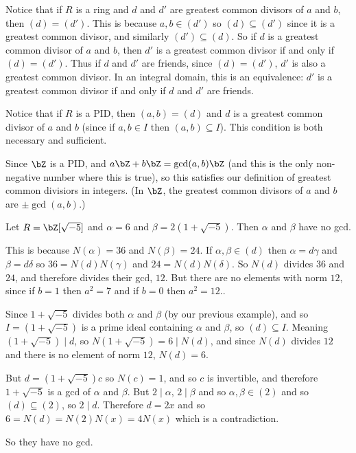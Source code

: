 \documentclass[10pt]{article}
\def\divides{{\mid}}
\begin{document}
Notice that if $R$ is a ring and $d$ and $d'$ are greatest common divisors of $a$ and $b$, then $(d)=(d')$.
This is because $a,b\in(d')$ so $(d)\subseteq(d')$ since it is a greatest common divisor, and similarly $(d')\subseteq(d)$.
So if $d$ is a greatest common divisor of $a$ and $b$, then $d'$ is a greatest common divisor if and only if $(d)=(d')$.
Thus if $d$ and $d'$ are friends, since $(d)=(d')$, $d'$ is also a greatest common divisor.
In an integral domain, this is an equivalence: $d'$ is a greatest common divisor if and only if $d$ and $d'$ are friends.

Notice that if $R$ is a PID, then $(a,b)=(d)$ and $d$ is a greatest common divisor of $a$ and $b$ (since if $a,b\in I$ then $(a,b)\subseteq I$).
This condition is both necessary and sufficient.

Since $\bZ$ is a PID, and $a\bZ+b\bZ=\gcd(a,b)\bZ$ (and this is the only non-negative number where this is true), so this satisfies our definition of greatest common divisiors in integers.
(In $\bZ$, the greatest common divisors of $a$ and $b$ are $\pm\gcd(a,b)$.)

\begin{exam*}

    Let $R=\bZ[\sqrt{-5}]$ and $\alpha=6$ and $\beta=2(1+\sqrt{-5})$.
    Then $\alpha$ and $\beta$ have no gcd.

    This is because $N(\alpha)=36$ and $N(\beta)=24$.
    If $\alpha,\beta\in(d)$ then $\alpha=d\gamma$ and $\beta=d\delta$ so $36=N(d)N(\gamma)$ and $24=N(d)N(\delta)$.
    So $N(d)$ divides $36$ and $24$, and therefore divides their gcd, $12$.
    But there are no elements with norm $12$, since if $b=1$ then $a^2=7$ and if $b=0$ then $a^2=12$..

    Since $1+\sqrt{-5}$ divides both $\alpha$ and $\beta$ (by our previous example), and so $I=(1+\sqrt{-5})$ is a prime ideal containing $\alpha$ and $\beta$, so $(d)\subseteq I$.
    Meaning $(1+\sqrt{-5})\divides d$, so $N(1+\sqrt{-5})=6\divides N(d)$, and since $N(d)$ divides $12$ and there is no element of norm $12$, $N(d)=6$.

    But $d=(1+\sqrt{-5})c$ so $N(c)=1$, and so $c$ is invertible, and therefore $1+\sqrt{-5}$ is a gcd of $\alpha$ and $\beta$.
    But $2\divides\alpha$, $2\divides\beta$ and so $\alpha,\beta\in(2)$ and so $(d)\subseteq(2)$, so $2\divides d$.
    Therefore $d=2x$ and so $6=N(d)=N(2)N(x)=4N(x)$ which is a contradiction.

    So they have no gcd.

\end{exam*}
\end{document}
